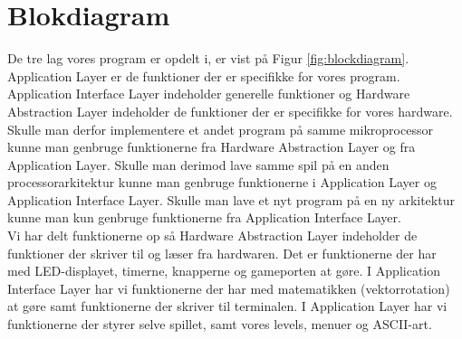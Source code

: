 \section{Blokdiagram}




De tre lag vores program er opdelt i, er vist på Figur \ref{fig:blockdiagram}. Application Layer er de funktioner der er specifikke for vores program. Application Interface Layer indeholder generelle funktioner og Hardware Abstraction Layer indeholder de funktioner der er specifikke for vores hardware. Skulle man derfor implementere et andet program på samme mikroprocessor kunne man genbruge funktionerne fra Hardware Abstraction Layer og fra Application Layer. Skulle man derimod lave samme spil på en anden processorarkitektur kunne man genbruge funktionerne i Application Layer og Application Interface Layer. Skulle man lave et nyt program på en ny arkitektur kunne man kun genbruge funktionerne fra Application Interface Layer. \\
Vi har delt funktionerne op så Hardware Abstraction Layer indeholder de funktioner der skriver til og læser fra hardwaren. Det er funktionerne der har med LED-displayet, timerne, knapperne og gameporten at gøre. I Application Interface Layer har vi funktionerne der har med matematikken (vektorrotation) at gøre samt funktionerne der skriver til terminalen. I Application Layer har vi funktionerne der styrer selve spillet, samt vores levels, menuer og ASCII-art. 

